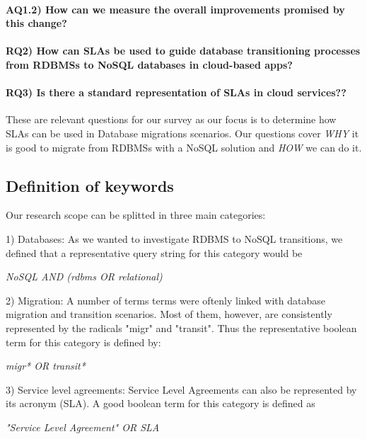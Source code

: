 \documentclass{article}
\begin{document}
\paragraph*{\textbf{AQ1.2)} How can we measure the overall improvements promised by this change?}

\paragraph*{\textbf{RQ2)} How can SLAs be used to guide database transitioning processes from RDBMSs to NoSQL databases in cloud-based apps? }
\paragraph*{\textbf{RQ3)} Is there a standard representation of SLAs in cloud services?? }

These are relevant questions for our survey as our focus is to determine how SLAs can be used in Database migrations scenarios. Our questions cover \textit{WHY} it is good to migrate from RDBMSs with a NoSQL solution and \textit{HOW} we can do it. 


\subsection{Definition of keywords}

Our research scope can be splitted in three main categories: 

1) Databases: As we wanted to investigate RDBMS to NoSQL transitions, we defined that a representative query string for this category would be 

\begin{center}
\textit{NoSQL AND (rdbms OR relational)}
\end{center}

2) Migration: A number of terms terms were oftenly linked with database migration and transition scenarios. Most of them, however, are consistently represented by the radicals "migr" and "transit". Thus the representative boolean term for this category is defined by: 


\begin{center}
\textit{migr* OR transit*}
\end{center}


3) Service level agreements: Service Level Agreements can also be represented by its acronym (SLA). A good boolean term for this category is defined as 
\begin{center}
\textit{"Service Level Agreement" OR SLA}
\end{center}
\end{document}
